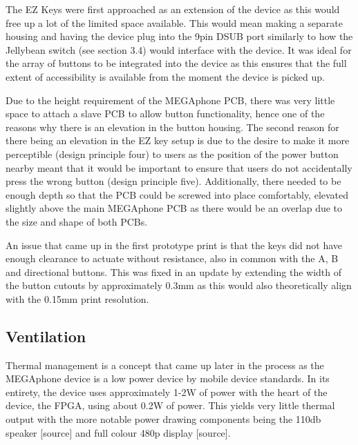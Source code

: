 The EZ Keys were first approached as an extension of the device as this would free up a lot of the limited space available.
This would mean making a separate housing and having the device plug into the 9pin DSUB port similarly to how the Jellybean switch (see section 3.4) would interface with the device.
It was ideal for the array of buttons to be integrated into the device as this ensures that the full extent of accessibility is available from the moment the device is picked up.

Due to the height requirement of the MEGAphone PCB, there was very little space to attach a slave PCB to allow button functionality, hence one of the reasons why there is an elevation in the button housing.
The second reason for there being an elevation in the EZ key setup is due to the desire to make it more perceptible (design principle four) to users as the position of the power button nearby meant that it would be important to ensure that users do not accidentally press the wrong button (design principle five).
Additionally, there needed to be enough depth so that the PCB could be screwed into place comfortably, elevated slightly above the main MEGAphone PCB as there would be an overlap due to the size and shape of both PCBs.

An issue that came up in the first prototype print is that the keys did not have enough clearance to actuate without resistance, also in common with the A, B and directional buttons.
This was fixed in an update by extending the width of the button cutouts by approximately 0.3mm as this would also theoretically align with the 0.15mm print resolution. %


\subsection{Ventilation} %

Thermal management is a concept that came up later in the process as the MEGAphone device is a low power device by mobile device standards.
In its entirety, the device uses approximately 1-2W of power with the heart of the device, the FPGA, using about 0.2W of power.
This yields very little thermal output with the more notable power drawing components being the 110db speaker [source] and full colour 480p display [source].

